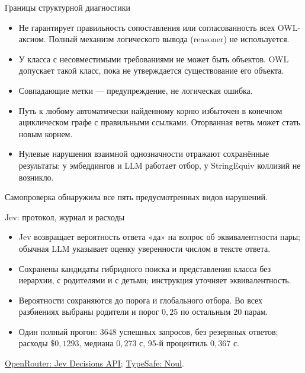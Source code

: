 \documentclass[aspectratio=169,11pt]{beamer}
\begin{document}
\renewcommand{\hseheadertext}{Дополнительные материалы}
\begin{frame}{Границы структурной диагностики}
  \begin{itemize}
    \item Не гарантирует правильность сопоставления или согласованность всех OWL-аксиом.
      Полный механизм логического вывода (reasoner) не используется.
    \item У класса с несовместимыми требованиями не может быть объектов.
      OWL допускает такой класс, пока не утверждается существование его объекта.
    \item Совпадающие метки — предупреждение, не логическая ошибка.
    \item Путь к любому автоматически найденному корню избыточен
      в конечном ациклическом графе с правильными ссылками.
      Оторванная ветвь может стать новым корнем.
    \item Нулевые нарушения взаимной однозначности отражают сохранённые результаты:
      у эмбеддингов и LLM работает отбор, у StringEquiv коллизий не возникло.
  \end{itemize}
  Самопроверка обнаружила все пять предусмотренных видов нарушений.
\end{frame}

\renewcommand{\hseheadertext}{Дополнительные материалы}
\begin{frame}{Jev: протокол, журнал и расходы}
  \begin{itemize}
    \item Jev возвращает вероятность ответа «да» на вопрос об эквивалентности пары;
      обычная LLM указывает оценку уверенности числом в тексте ответа.
    \item Сохранены кандидаты гибридного поиска и представления класса
      без иерархии, с родителями и с детьми; инструкция уточняет эквивалентность.
    \item Вероятности сохраняются до порога и глобального отбора.
      Во всех разбиениях выбраны родители и порог $0{,}25$ по остальным 20 парам.
    \item Один полный прогон: 3648 успешных запросов, без резервных ответов;
      расходы $\$0{,}1293$, медиана $0{,}273$ с, 95-й процентиль $0{,}367$ с.
  \end{itemize}
  \href{https://openrouter.ai/docs/guides/community/jev}{OpenRouter: Jev Decisions API};
  \href{https://docs.typesafe.ai/primitives/noul}{TypeSafe: Noul}.
\end{frame}
\end{document}
